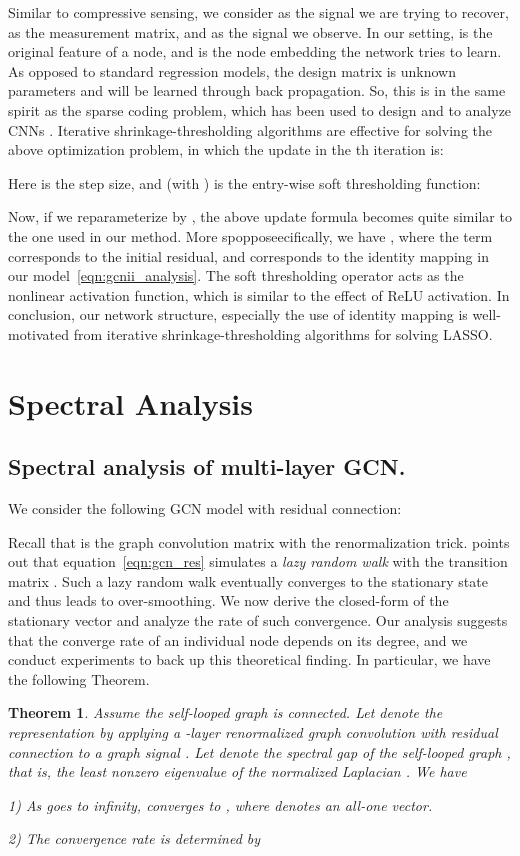 \documentclass{article}
\newtheorem{theorem}{Theorem}
\begin{document}
Similar to  compressive sensing, we consider  as the signal we are trying to recover,  as the measurement matrix, and  as the signal we observe. In our setting,  is the original feature of a node, and  is the node embedding the network tries to learn. As opposed to standard regression models, the design matrix  is unknown parameters and will be learned through back propagation. So, this is in the same spirit as the sparse coding problem, which has been used to design and to analyze CNNs \cite{papyan2017convolutional}. Iterative shrinkage-thresholding algorithms are effective for solving the above optimization problem, in which the update in the th iteration is:

Here  is the step size, and  (with ) is the entry-wise soft thresholding function:

Now, if we reparameterize  by , the above update formula becomes quite similar to the one used in our method. More spopposeecifically, we have , where the term  corresponds to the initial residual,  and  corresponds to the identity mapping 
in our model~\eqref{eqn:gcnii_analysis}. The soft thresholding operator acts as the nonlinear activation function, which is similar to the effect of ReLU activation. In conclusion, our network structure, especially the use of identity mapping is well-motivated from iterative shrinkage-thresholding algorithms for solving LASSO.
  \section{Spectral Analysis}
\label{sec:analysis}
\subsection{Spectral analysis of multi-layer GCN. }
We consider the following GCN model
with residual connection: 

Recall that   is the graph
convolution matrix with the renormalization trick.
\cite{wang2019improving} points out that equation~\eqref{eqn:gcn_res}
simulates a {\em lazy random walk} with the transition matrix  .  Such a lazy random walk eventually
converges to the stationary state and thus leads to
over-smoothing. We now derive the closed-form of the
stationary vector and analyze the rate of such convergence. Our analysis suggests that the converge
rate of an individual node depends on its degree, and we conduct
experiments to back up this theoretical finding. In particular, we have the following Theorem.

\begin{theorem}
  \label{thm:GCN}
  Assume the self-looped graph  is connected. 
  Let  denote the representation by applying a
-layer renormalized graph convolution with residual connection to
a graph signal . Let  denote the
spectral gap of the self-looped graph , that is,  the least nonzero eigenvalue of the
normalized Laplacian  .  We have
  
1) As  goes to infinity,  converges to , where  denotes an all-one vector.

2) The convergence rate is determined by


\end{theorem}
\end{document}
